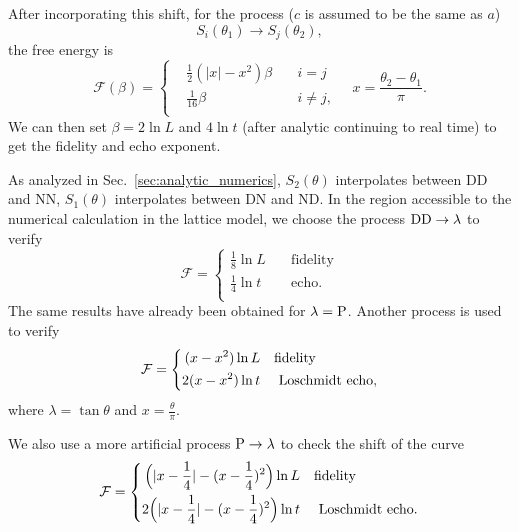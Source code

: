 After incorporating this shift, for the process ($c$ is assumed to be the same as $a$)
\begin{equation}
\label{eq:S_i_S_j}
S_i( \theta_1 ) \rightarrow S_j( \theta_2 ) ,
\end{equation}
the free energy is
\begin{equation}
\mathcal{F}( \beta )  = 
\left\lbrace
\begin{aligned}
  &\frac{1}{2}(|x| - x^2 )\beta  \quad &i = j \\
  &\frac{1}{16}\beta   \quad &i \ne j ,  \\
\end{aligned} \right. \quad x = \frac{\theta_2 - \theta_1}{\pi} .
\end{equation}
We can then set $\beta = 2 \ln L$ and $ 4 \ln t$ (after analytic continuing to real time) to get the fidelity and echo exponent. 

As analyzed in Sec.~\ref{sec:analytic_numerics}, $S_2( \theta)$ interpolates between DD and NN, $S_1( \theta )$ interpolates between DN and ND. In the region accessible to the numerical calculation in the lattice model, we choose the process ${\rm DD} \rightarrow  \lambda$ to verify
\begin{equation}
\label{eq:result_DDDD}
\mathcal{F} = 
\left\lbrace
\begin{aligned}
\frac{1}{8}\ln L  &\quad\text{fidelity}  \\
\frac{1}{4}\ln t   &\quad \text{echo} .  \\
\end{aligned} \right.  
\end{equation}
The same results have already been obtained for $\lambda = {\rm P}$\cite{stephan_logarithmic_2013,stephan_local_2011,vasseur_universal_2014,vasseur_crossover_2013,kennes_universal_2014}. Another process  {\iffalse \color{red} in Eq.~\eqref{eq:DNDN}\fi} is used to verify
\begin{equation}
\label{eq:result_DNDN}
\mathcal{F} = 
\left\lbrace
\begin{aligned}
 (x - x^2 )\ln L   &  \quad {\rm fidelity} \\
 2(x - x^2 ) \ln t  & \quad \text{ Loschmidt echo} , \\
\end{aligned} \right. 
\end{equation}
where $\lambda = \tan \theta$ and $x = \frac{\theta}{\pi}$. 

We also use a more artificial process ${\rm P} \rightarrow \lambda$ to check the shift of the curve
\begin{equation}
\label{eq:periodic-case}
\mathcal{F} = 
\left\lbrace
\begin{aligned}
  \Big(|x-\frac{1}{4}| - (x-\frac{1}{4})^2 \Big)\ln L   &  \quad {\rm fidelity} \\
  2\Big(|x-\frac{1}{4}| - (x-\frac{1}{4})^2 \Big) \ln t  & \quad \text{ Loschmidt echo} .\\
\end{aligned} \right. 
\end{equation}



